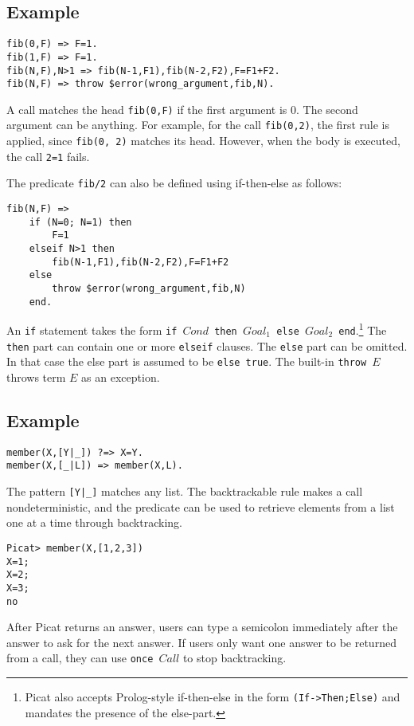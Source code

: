 \subsection*{Example}
\begin{verbatim}
fib(0,F) => F=1.
fib(1,F) => F=1.
fib(N,F),N>1 => fib(N-1,F1),fib(N-2,F2),F=F1+F2.
fib(N,F) => throw $error(wrong_argument,fib,N).
\end{verbatim}

A call matches the head \texttt{fib(0,F)} if the first argument is 0. The second argument can be anything. For example, for the call \texttt{fib(0,2)}, the first rule is applied, since \texttt{fib(0, 2)} matches its head. However, when the body is executed, the call \texttt{2=1} fails.  

The predicate \texttt{fib/2} can also be defined using if-then-else as follows:
\begin{verbatim}
fib(N,F) => 
    if (N=0; N=1) then 
        F=1 
    elseif N>1 then 
        fib(N-1,F1),fib(N-2,F2),F=F1+F2
    else 
        throw $error(wrong_argument,fib,N)
    end.
\end{verbatim}
An \texttt{if} statement takes the form \texttt{if $Cond$ then $Goal_1$ else $Goal_2$ end}.\footnote{Picat also accepts Prolog-style if-then-else in the form \texttt{(If->Then;Else)} and mandates the presence of the else-part.} The \texttt{then} part can contain one or more \texttt{elseif} clauses. The \texttt{else} part can be omitted. In that case the else part is assumed to be \texttt{else true}. The built-in \texttt{throw $E$} throws term $E$ as an exception.

\subsection*{Example}
\begin{verbatim}
member(X,[Y|_]) ?=> X=Y.
member(X,[_|L]) => member(X,L).
\end{verbatim}

The pattern \verb+[Y|_]+ matches any list. The backtrackable rule makes a call nondeterministic, and the predicate can be used to retrieve elements from a list one at a time through backtracking.
\begin{verbatim}
Picat> member(X,[1,2,3])
X=1;
X=2;
X=3;
no
\end{verbatim}
After Picat returns an answer, users can type a semicolon immediately after the answer to ask for the next answer. If users only want one answer to be returned from a call, they can use \texttt{once $Call$} to stop backtracking.

